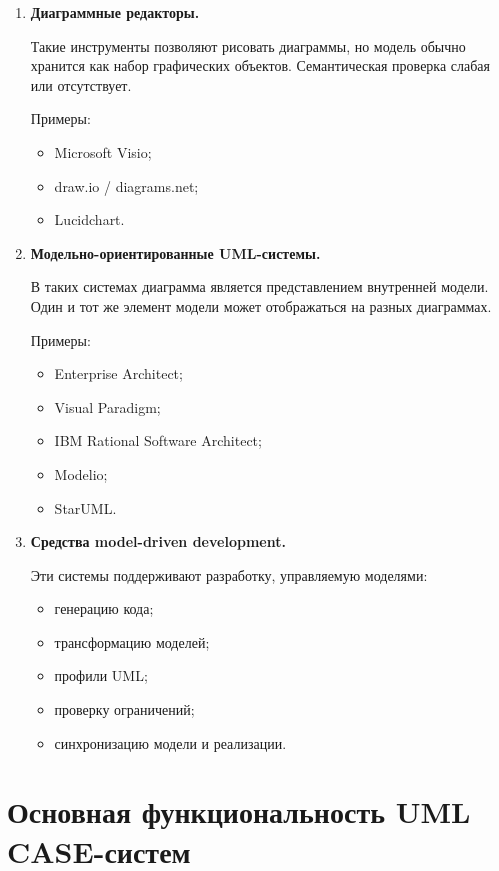 \documentclass[12pt,a4paper]{article}
\begin{document}
\begin{enumerate}
    \item \textbf{Диаграммные редакторы.}

    Такие инструменты позволяют рисовать диаграммы, но модель обычно хранится как набор графических объектов. Семантическая проверка слабая или отсутствует.

    Примеры:
    \begin{itemize}
        \item Microsoft Visio;
        \item draw.io / diagrams.net;
        \item Lucidchart.
    \end{itemize}

    \item \textbf{Модельно-ориентированные UML-системы.}

    В таких системах диаграмма является представлением внутренней модели. Один и тот же элемент модели может отображаться на разных диаграммах.

    Примеры:
    \begin{itemize}
        \item Enterprise Architect;
        \item Visual Paradigm;
        \item IBM Rational Software Architect;
        \item Modelio;
        \item StarUML.
    \end{itemize}

    \item \textbf{Средства model-driven development.}

    Эти системы поддерживают разработку, управляемую моделями:
    \begin{itemize}
        \item генерацию кода;
        \item трансформацию моделей;
        \item профили UML;
        \item проверку ограничений;
        \item синхронизацию модели и реализации.
    \end{itemize}
\end{enumerate}

\section{Основная функциональность UML CASE-систем}
\end{document}
